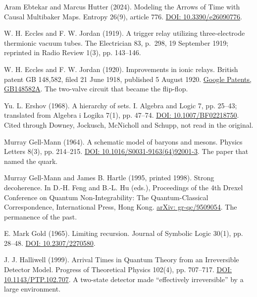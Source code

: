 \documentclass[11pt,twoside]{article}
\theoremstyle{thielethm}
\theoremstyle{thieledef}
\theoremstyle{thieledef}
\theoremstyle{thieledef}
\theoremstyle{thielethm}
\theoremstyle{thieleobs}
\theoremstyle{thielethm}
\begin{document}
\noindent Aram Ebtekar and Marcus Hutter (2024). Modeling the Arrows of Time with Causal Multibaker Maps. Entropy 26(9), article 776. \href{https://doi.org/10.3390/e26090776}{DOI: 10.3390/e26090776}.
\par\medskip

\noindent W. H. Eccles and F. W. Jordan (1919). A trigger relay utilizing three-electrode thermionic vacuum tubes. The Electrician 83, p.~298, 19 September 1919; reprinted in Radio Review 1(3), pp. 143--146.
\par\medskip

\noindent W. H. Eccles and F. W. Jordan (1920). Improvements in ionic relays. British patent GB 148,582, filed 21 June 1918, published 5 August 1920. \href{https://patents.google.com/patent/GB148582A/en}{Google Patents, GB148582A}. The two-valve circuit that became the flip-flop.
\par\medskip

\noindent Yu. L. Ershov (1968). A hierarchy of sets. I. Algebra and Logic 7, pp. 25--43; translated from Algebra i Logika 7(1), pp. 47--74. \href{https://doi.org/10.1007/BF02218750}{DOI: 10.1007/BF02218750}. Cited through Downey, Jockusch, McNicholl and Schupp, not read in the original.
\par\medskip

\noindent Murray Gell-Mann (1964). A schematic model of baryons and mesons. Physics Letters 8(3), pp. 214--215. \href{https://doi.org/10.1016/S0031-9163(64)92001-3}{DOI: 10.1016/S0031-9163(64)92001-3}. The paper that named the quark.
\par\medskip

\noindent Murray Gell-Mann and James B. Hartle (1995, printed 1998). Strong decoherence. In D.-H. Feng and B.-L. Hu (eds.), Proceedings of the 4th Drexel Conference on Quantum Non-Integrability: The Quantum-Classical Correspondence, International Press, Hong Kong. \href{https://arxiv.org/abs/gr-qc/9509054}{arXiv: gr-qc/9509054}. The permanence of the past.
\par\medskip

\noindent E. Mark Gold (1965). Limiting recursion. Journal of Symbolic Logic 30(1), pp. 28--48. \href{https://doi.org/10.2307/2270580}{DOI: 10.2307/2270580}.
\par\medskip

\noindent J. J. Halliwell (1999). Arrival Times in Quantum Theory from an Irreversible Detector Model. Progress of Theoretical Physics 102(4), pp. 707--717. \href{https://doi.org/10.1143/PTP.102.707}{DOI: 10.1143/PTP.102.707}. A two-state detector made ``effectively irreversible'' by a large environment.
\par\medskip
\end{document}
